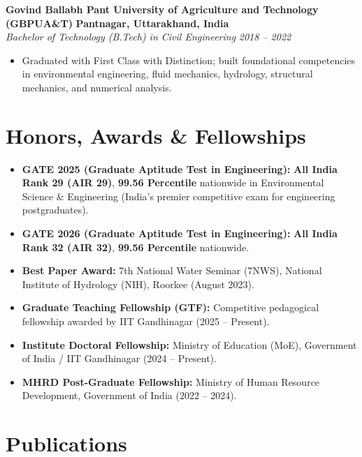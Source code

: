 \documentclass[10pt,a4paper]{article}
\newcommand{\entryheader}[4]{
    \noindent\textbf{#1} \hfill \textbf{\color{subtext}#2} \\
    \textit{#3} \hfill \textit{\color{subtext}#4}
    \vspace{1.5pt}
}
\begin{document}
\entryheader{Govind Ballabh Pant University of Agriculture and Technology (GBPUA\&T)}{Pantnagar, Uttarakhand, India}{Bachelor of Technology (B.Tech) in Civil Engineering}{2018 -- 2022}
\begin{itemize}
    \item Graduated with First Class with Distinction; built foundational competencies in environmental engineering, fluid mechanics, hydrology, structural mechanics, and numerical analysis.
\end{itemize}

\section{Honors, Awards \& Fellowships}
\begin{itemize}
    \item \textbf{GATE 2025 (Graduate Aptitude Test in Engineering):} \textbf{All India Rank 29 (AIR 29)}, \textbf{99.56 Percentile} nationwide in Environmental Science \& Engineering (India's premier competitive exam for engineering postgraduates).
    \item \textbf{GATE 2026 (Graduate Aptitude Test in Engineering):} \textbf{All India Rank 32 (AIR 32)}, \textbf{99.56 Percentile} nationwide.
    \item \textbf{Best Paper Award:} 7th National Water Seminar (7NWS), National Institute of Hydrology (NIH), Roorkee (August 2023).
    \item \textbf{Graduate Teaching Fellowship (GTF):} Competitive pedagogical fellowship awarded by IIT Gandhinagar (2025 -- Present).
    \item \textbf{Institute Doctoral Fellowship:} Ministry of Education (MoE), Government of India / IIT Gandhinagar (2024 -- Present).
    \item \textbf{MHRD Post-Graduate Fellowship:} Ministry of Human Resource Development, Government of India (2022 -- 2024).
\end{itemize}

\section{Publications}
\end{document}
